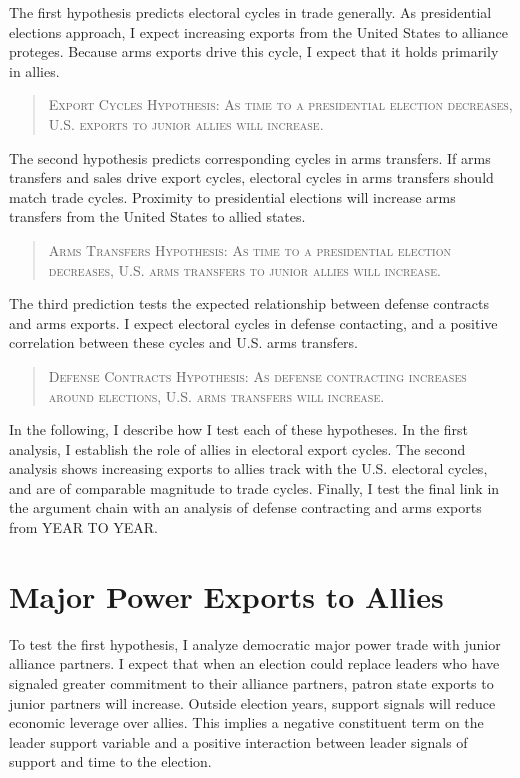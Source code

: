 \documentclass[12pt]{article}
\begin{document}
The first hypothesis predicts electoral cycles in trade generally. 
As presidential elections approach, I expect increasing exports from the United States to alliance proteges.
Because arms exports drive this cycle, I expect that it holds primarily in allies.


\begin{quote}
\textsc{Export Cycles Hypothesis: As time to a presidential election decreases, U.S. exports to junior allies will increase.}
\end{quote}



The second hypothesis predicts corresponding cycles in arms transfers.
If arms transfers and sales drive export cycles, electoral cycles in arms transfers should match trade cycles.
Proximity to presidential elections will increase arms transfers from the United States to allied states. 


\begin{quote}
\textsc{Arms Transfers Hypothesis: As time to a presidential election decreases, U.S. arms transfers to junior allies will increase.}
\end{quote}


The third prediction tests the expected relationship between defense contracts and arms exports. 
I expect electoral cycles in defense contacting, and a positive correlation between these cycles and U.S. arms transfers.


\begin{quote}
\textsc{Defense Contracts Hypothesis: As defense contracting increases around elections, U.S. arms transfers will increase.}
\end{quote}



In the following, I describe how I test each of these hypotheses. 
In the first analysis, I establish the role of allies in electoral export cycles. 
The second analysis shows increasing exports to allies track with the U.S. electoral cycles, and are of comparable magnitude to trade cycles.
Finally, I test the final link in the argument chain with an analysis of defense contracting and arms exports from YEAR TO YEAR.




\section{Major Power Exports to Allies}

To test the first hypothesis, I analyze democratic major power trade with junior alliance partners. 
I expect that when an election could replace leaders who have signaled greater commitment to their alliance partners, patron state exports to junior partners will increase.
Outside election years, support signals will reduce economic leverage over allies.
This implies a negative constituent term on the leader support variable and a positive interaction between leader signals of support and time to the election.
\end{document}
